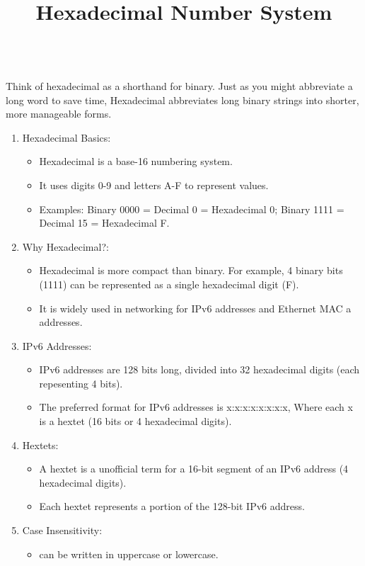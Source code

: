 \documentclass[a4paper,11pt]{article}
\begin{document}
\title{Hexadecimal Number System}\\
Think of hexadecimal as a shorthand for binary. Just as you might abbreviate a long word to save time, Hexadecimal abbreviates long binary strings into shorter, more manageable forms.\\
\begin{enumerate}
    \item Hexadecimal Basics:\\
    \begin{itemize}
        \item Hexadecimal is a base-16 numbering system.\\
        \item It uses digits 0-9 and letters A-F to represent values.\\
        \item Examples: Binary 0000 = Decimal 0 = Hexadecimal 0; Binary 1111 = Decimal 15  = Hexadecimal F.\\
    \end{itemize}
    \item Why Hexadecimal?:\\
    \begin{itemize}
        \item Hexadecimal is more compact than binary. For example, 4 binary bits (1111) can be represented as a single hexadecimal digit (F).\\
        \item It is widely used in networking for IPv6 addresses and Ethernet MAC a addresses.\\
    \end{itemize}
    \item IPv6 Addresses:\\
    \begin{itemize}
        \item IPv6 addresses are 128 bits long, divided into 32 hexadecimal digits (each repesenting 4 bits).\\
        \item The preferred format for IPv6 addresses is x:x:x:x:x:x:x:x, Where each x is a hextet (16 bits or 4 hexadecimal digits).\\
    \end{itemize}
    \item Hextets:\\
    \begin{itemize}
        \item A hextet is a unofficial term for a 16-bit segment of an IPv6 address (4 hexadecimal digits).\\
        \item Each hextet represents a portion of the 128-bit IPv6 address.\\
    \end{itemize}
    \item Case Insensitivity:\\
    \begin{itemize}
        \item can be written in uppercase or lowercase.\\
    \end{itemize}
\end{enumerate}
\end{document}
